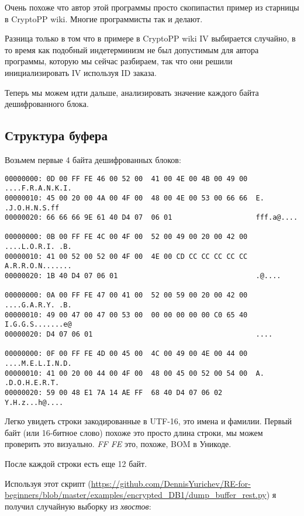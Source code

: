 Очень похоже что автор этой программы просто скопипастил пример из старницы в CryptoPP wiki.
Многие программисты так и делают.

Разница только в том что в примере в CryptoPP wiki \ac{IV} выбирается случайно, в то время как подобный индетерминизм
не был допустимым для автора программы, которую мы сейчас разбираем,
так что они решили инициализировать \ac{IV} используя ID заказа.

Теперь мы можем идти дальше, анализировать значение каждого байта дешифрованного блока.

\subsection{Структура буфера}

Возьмем первые 4 байта дешифрованных блоков:

\begin{lstlisting}
00000000: 0D 00 FF FE 46 00 52 00  41 00 4E 00 4B 00 49 00  ....F.R.A.N.K.I.
00000010: 45 00 20 00 4A 00 4F 00  48 00 4E 00 53 00 66 66  E. .J.O.H.N.S.ff
00000020: 66 66 66 9E 61 40 D4 07  06 01                    fff.a@....

00000000: 0B 00 FF FE 4C 00 4F 00  52 00 49 00 20 00 42 00  ....L.O.R.I. .B.
00000010: 41 00 52 00 52 00 4F 00  4E 00 CD CC CC CC CC CC  A.R.R.O.N.......
00000020: 1B 40 D4 07 06 01                                 .@....

00000000: 0A 00 FF FE 47 00 41 00  52 00 59 00 20 00 42 00  ....G.A.R.Y. .B.
00000010: 49 00 47 00 47 00 53 00  00 00 00 00 00 C0 65 40  I.G.G.S.......e@
00000020: D4 07 06 01                                       ....

00000000: 0F 00 FF FE 4D 00 45 00  4C 00 49 00 4E 00 44 00  ....M.E.L.I.N.D.
00000010: 41 00 20 00 44 00 4F 00  48 00 45 00 52 00 54 00  A. .D.O.H.E.R.T.
00000020: 59 00 48 E1 7A 14 AE FF  68 40 D4 07 06 02        Y.H.z...h@....
\end{lstlisting}

Легко увидеть строки закодированные в UTF-16, это имена и фамилии.
Первый байт (или 16-битное слово) похоже это просто длина строки, мы можем проверить это визуально.
\emph{FF FE} это, похоже, \ac{BOM} в Уникоде.

После каждой строки есть еще 12 байт.

Используя этот скрипт
(\url{https://github.com/DennisYurichev/RE-for-beginners/blob/master/examples/encrypted_DB1/dump_buffer_rest.py})
я получил случайную выборку из \emph{хвостов}:

